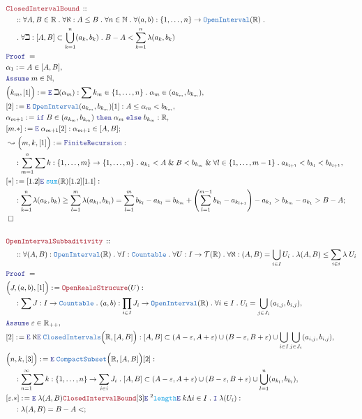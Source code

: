 \documentclass[12pt]{scrartcl}
\newcommand{\TYPE}[1]{\textcolor{NavyBlue}{\mathtt{#1}}}
\newcommand{\FUNC}[1]{\textcolor{Cerulean}{\mathtt{#1}}}
\newcommand{\LOGIC}[1]{\textcolor{Blue}{\mathtt{#1}}}
\newcommand{\THM}[1]{\textcolor{Maroon}{\mathtt{#1}}}
\renewcommand{\.}{\; . \;}
\newcommand{\de}{: \kern 0.1pc =}
\newcommand{\If}{\LOGIC{if} \;}
\newcommand{\Then}{ \; \LOGIC{then} \;}
\newcommand{\Else}{\; \LOGIC{else} \;}
\newcommand{\Theorem}[2]{& \THM{#1} \, :: \, #2 \\ & \Proof = \\ }
\newcommand{\NewLine}{\\ & \kern 1pc}
\newcommand{\Page}[1]{ \begin{align*} #1 \end{align*}   }
\renewcommand{\And}{\; \& \;}
\newcommand{\Reals}{\mathbb{R} }
\newcommand{\Nat}{\mathbb{N} }
\newcommand{\Say}[3]{& #1 \de #2 : #3, \\}
\newcommand{\SayIn}[3]{& #1 \de #2 \in #3, \\}
\newcommand{\Conclude}[3]{& #1 \de #2 : #3; \\}
\newcommand{\Derive}[3]{& \leadsto #1 \de #2 : #3, \\}
\newcommand{\AssumeIn}[2]{& \LOGIC{Assume} \; #1 \in #2, \\}
\newcommand{\QED}{\; \square}
\newcommand{\EndProof}{& \QED \\}
\newcommand{\Proof}{\LOGIC{Proof} \; }
\newcommand{\Elim}{\LOGIC{E} \; }
\newcommand{\Intro}{\LOGIC{I} \;}
\newcommand{\Compacts}{\TYPE{CompactSubset}}
\newcommand{\T}{\mathcal{T}}
\newcommand{\OI}{\TYPE{OpenInterval}}
\begin{document}
\Page{
	\Theorem{ClosedIntervalBound}
	{
		\NewLine ::		
		\forall A,B \in \Reals \.
		\forall \aleph : A \le B \.
		\forall n \in \Nat \. 
		\forall (a,b) : \{1,\ldots,n\} \to \OI(\Reals) \. \NewLine \.
		\forall \beth : [A,B] \subset \bigcup^n_{k=1} (a_k,b_k) \.
		B - A < \sum^n_{k=1} \lambda(a_k,b_k)
	}
	\SayIn{\alpha_1}{A}{[A,B]}
	\AssumeIn{m}{\Nat}
	\Say{\Big( k_m, [1]\Big) }{\Elim \beth (\alpha_m)}
	{
			\sum k_m \in \{ 1, \ldots, n  \} \. \alpha_m \in (a_{k_m},b_{k_m})
	}
	\Say{[2]}{\Elim \OI(a_{k_m},b_{k_m})[1]}{A \le \alpha_m < b_{k_m}}
	\Say{\alpha_{m+1}}{\If B \in (a_{k_m},b_{k_m}) \Then \alpha_m \Else b_{k_m} }
	{
		\Reals
	}
	\Conclude{[m.*]}{\Elim \alpha_{m+1}[2]}{\alpha_{m+1} \in [A,B]}
	\Derive{\Big(m,k,[1]\Big)}{\LOGIC{FiniteRecursion}}
	{
		\NewLine :		
		\sum^n_{m=1} \sum k : \{1, \ldots, m \} \to \{1,\ldots, n\} \.
		a_{k_1} < A \And B < b_{k_m} \And 
		\forall l \in  \{1,\ldots, m-1 \} \.
		 a_{k_{l+1}} < b_{k_l} < b_{k_{l+1}}
	}
	\Conclude{[*]}{
		[1.2] \Elim \FUNC{sum}(\Reals) [1.2] [1.1]	
	}
	{
		\NewLine :		
		\sum^n_{k=1} \lambda(a_k,b_k) \ge
		\sum^m_{l=1} \lambda(a_{k_l}, b_{k_l})  =
		\sum^m_{l=1} b_{k_l} - a_{k_l} =
		b_{k_m} +  \left(\sum^{m-1}_{l=1} b_{k_l} - a_{k_{l+1}}\right)  - a_{k_1} > 
		b_{k_m} - a_{k_1} > B - A
	}
	\EndProof
	\\
	\Theorem{OpenIntervalSubbaditivity}
	{
		\NewLine ::		
		\forall (A,B) : \OI(\Reals) \.
		\forall I : \TYPE{Countable} \.
		\forall U : I \to \T(\Reals) \.
		\forall \aleph : (A,B) = \bigcup_{i \in I} U_i \.
		\lambda(A,B) \le \sum_{i \in i} \lambda\;U_i 
	}
	\Say{\Big(J,(a,b),[1] \Big)}
	{
		\THM{OpenRealsStrucure}(U)
	}
	{
		\NewLine :		
		\sum J : I \to \TYPE{Countable} \. 
		(a,b) : \prod_{i \in I} J_i \to \OI(\Reals) \.
		\forall i \in I \. U_i = \bigcup_{j \in J_i} (a_{i,j},b_{i,j})
	}
	\AssumeIn{\varepsilon}{\Reals_{++}}
	\Say{[2]}{\Elim \aleph \Elim \TYPE{ClosedIntervals}\Big( \Reals, [A,B] \Big)}
	{
		[A,B] \subset  
			(A-\varepsilon,A + \varepsilon) \cup (B-\varepsilon,B+\varepsilon)		\cup
			\bigcup_{i \in I} \bigcup_{j \in J_i}  (a_{i,j},b_{i,j})
	}
	\Say{\Big( n,k, [3] \Big)}{\Elim \Compacts\Big( \Reals, [A,B] \Big)[2]}
	{
		\NewLine :		
		\sum^\infty_{n=1} \sum k : \{1,\ldots,n\} \to \sum_{i \in i} J_i \. 
		[A,B] \subset 
		(A-\varepsilon,A + \varepsilon) \cup (B-\varepsilon,B+\varepsilon)		\cup
			\bigcup^n_{l=1}  (a_{k_l},b_{k_l})
	}
	\Conclude{[\varepsilon.*]}{
		\Elim \lambda(A,B)
		\THM{ClosedIntervalBound}[3] 
		\Elim^2 \FUNC{length}
		\Elim k
		\Lambda i \in I \. \Intro \lambda(U_i)
	}
	{
		\NewLine :
		\lambda(A,B) = B - A 
		< 
}}
\end{document}

